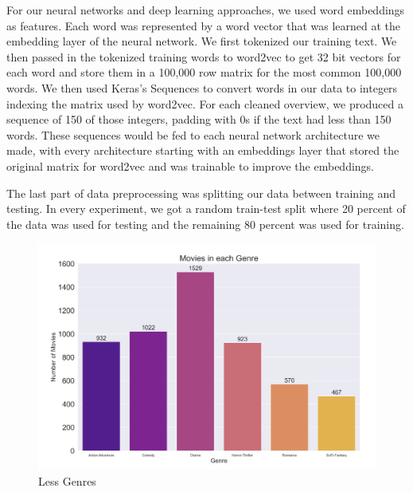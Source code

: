 \documentclass[sigconf]{acmart}
\begin{document}
For our neural networks and deep learning approaches, we used word embeddings as features.  Each word was represented by a word vector that was learned at the embedding layer of the neural network.  We first tokenized our training text. We then passed in the tokenized training words to word2vec to get 32 bit vectors for each word and store them in a 100,000 row matrix for the most common 100,000 words.  We then used Keras's Sequences to convert words in our data to integers indexing the matrix used by word2vec.  For each cleaned overview, we produced a sequence of 150 of those integers, padding with 0s if the text had less than 150 words. These sequences would be fed to each neural network architecture we made, with every architecture starting with an embeddings layer that stored the original matrix for word2vec and was trainable to improve the embeddings. 

The last part of data preprocessing was splitting our data between training and testing.  In every experiment, we got a random train-test split where 20 percent of the data was used for testing and the remaining 80 percent was used for training. 

\begin{figure}
	\includegraphics[width=\linewidth]{reduced_genres.png}
	\caption{Less Genres}
	\label{fig:less}
\end{figure}
\end{document}
